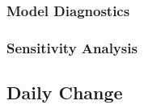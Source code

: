 \subsubsection{Model Diagnostics}


\subsubsection{Sensitivity Analysis}


\subsection{Daily Change}

